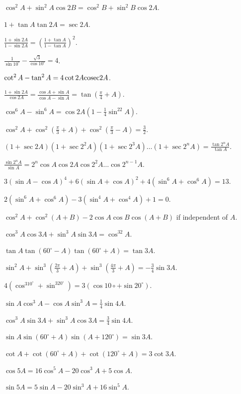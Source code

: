 \item $\cos^2A + \sin^2A\cos 2B = \cos^2B + \sin^2B\cos 2A$.
\item $1 + \tan A\tan 2A = \sec 2A$.
\item $\frac{1 + \sin 2A}{1 - \sin 2A} = \left(\frac{1 + \tan A}{1 - \tan A}\right)^2$.
\item $\frac{1}{\sin 10^\circ} - \frac{\sqrt{3}}{\cos 10^\circ} = 4$.
\item $\cot^2A - \tan^2A = 4\cot2A{\rm cosec} 2A$.
\item $\frac{1 +\sin 2A}{\cos2A} = \frac{\cos A + \sin A}{\cos A - \sin A} = \tan\left(\frac{\pi}{4} + A\right)$.
\item $\cos^6A - \sin^6A = \cos2A\left(1 - \frac{1}{4}\sin^22A\right)$.
\item $\cos^2A + \cos^2\left(\frac{\pi}{3} + A\right) + \cos^2\left(\frac{\pi}{3} - A\right)= \frac{3}{2}$.
\item $(1 + \sec2A)(1 + \sec2^2A)(1 + \sec2^3A) \ldots (1 + \sec2^nA) = \frac{\tan2^nA}{\tan A}$.
\item $\frac{\sin2^nA}{\sin A} = 2^n\cos A\cos 2A\cos 2^2A\ldots\cos2^{n - 1}A$.
\item $3(\sin A - \cos A)^4 + 6(\sin A + \cos A)^2 + 4(\sin^6A + \cos^6A) = 13$.
\item $2(\sin^6A + \cos^6A) - 3(\sin^4A + \cos^4A) + 1 = 0$.
\item $\cos^2A + \cos^2(A + B) -2\cos A\cos B\cos(A + B)$ if independent of $A$.
\item $\cos^3A\cos 3A + \sin^3A\sin 3A = \cos^32A$.
\item $\tan A\tan(60^\circ - A)\tan(60^\circ + A) = \tan 3A$.
\item $\sin^2A + \sin^3\left(\frac{2\pi}{3} + A\right) + \sin^3\left(\frac{4\pi}{3} + A\right) = -\frac{3}{4}\sin 3A$.
\item $4(\cos^310^\circ + \sin^320^\circ) = 3(\cos 10\circ + \sin 20^\circ)$.
\item $\sin A\cos^3A - \cos A\sin^3A = \frac{1}{4}\sin 4A$.
\item $\cos^3A\sin3A + \sin^3A\cos 3A = \frac{3}{4}\sin 4A$.
\item $\sin A\sin(60^\circ + A)\sin(A + 120^\circ) = \sin 3A$.
\item $\cot A + \cot(60^\circ + A) + \cot(120^\circ + A) = 3\cot 3A$.
\item $\cos 5A = 16\cos^5A - 20\cos^3A + 5\cos A$.
\item $\sin 5A = 5\sin A - 20\sin^3A + 16\sin^5A$.
